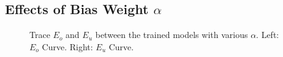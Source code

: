 \documentclass{article} %
\begin{document}
\subsection{Effects of Bias Weight $\alpha$}
\begin{figure}[hp]
    \centering
    \captionsetup{justification=centering}
    \caption{Trace $E_o$ and $E_u$ between the trained models with various
        $\alpha$. \newline
        Left: $E_o$ Curve. Right: $E_u$ Curve. } 
    \label{EffectK:Eo_Eu}
\end{figure}
\end{document}
